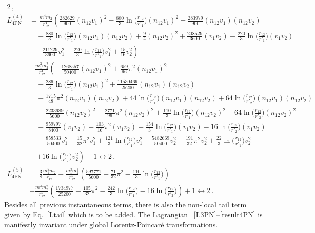 \documentclass[prd,preprint,superscriptaddress,tightenlines,nofootinbib,
  eqsecnum,showpacs]{revtex4}
\begin{document}
{\begin{subequations}
\begin{align}
2\,,\\
L_\text{4PN}^{(4)}&= \frac{m_{1}^4 m_{2}}{r_{12}^4} 
\left(\frac{282629}{900} (n_{12} v_1)^2
 -  \frac{880}{3} \ln\Big(\frac{r_{12}}{r'_{1}}\Big) (n_{12} v_1)^2
 -  \frac{283979}{900} (n_{12} v_1) (n_{12} v_2)\right.\nonumber\\
& \quad + \frac{880}{3} \ln\Big(\frac{r_{12}}{r'_{1}}\Big) (n_{12} v_1) (n_{12} v_2)
 + \frac{9}{4} (n_{12} v_2)^2
 + \frac{208529}{3600} (v_1 v_2)
 -  \frac{220}{3} \ln\Big(\frac{r_{12}}{r'_{1}}\Big) (v_1 v_2)\nonumber\\
&\quad \left. -  \frac{211229}{3600} v_1^{2}
 + \frac{220}{3} \ln\Big(\frac{r_{12}}{r'_{1}}\Big) v_1^{2}
 + \frac{15}{16} v_2^{2}\right) \nonumber \\
& + \frac{m_{1}^3 m_{2}^2}{r_{12}^4} \left(- \frac{1268557}{50400} (n_{12} v_1)^2  
+ \frac{659}{96} \pi^2 (n_{12} v_1)^2
 \right.\nonumber\\
& \quad -  \frac{286}{3} \ln\Big(\frac{r_{12}}{r'_{1}}\Big) (n_{12} v_1)^2
 + \frac{11530469}{25200} (n_{12} v_1) (n_{12} v_2) \nonumber\\
& \quad -  \frac{1715}{48} \pi^2 (n_{12} v_1) (n_{12} v_2)
 + 44 \ln\Big(\frac{r_{12}}{r'_{1}}\Big) (n_{12} v_1) (n_{12} v_2)
 + 64 \ln\Big(\frac{r_{12}}{r'_{2}}\Big) (n_{12} v_1) (n_{12} v_2)\nonumber\\
& \quad -  \frac{2233689}{5600} (n_{12} v_2)^2
 + \frac{2771}{96} \pi^2 (n_{12} v_2)^2
 + \frac{110}{3} \ln\Big(\frac{r_{12}}{r'_{1}}\Big) (n_{12} v_2)^2
 - 64 \ln\Big(\frac{r_{12}}{r'_{2}}\Big) (n_{12} v_2)^2\nonumber\\
& \quad -  \frac{959797}{8400} (v_1 v_2)
 + \frac{103}{16} \pi^2 (v_1 v_2)
 -  \frac{154}{3} \ln\Big(\frac{r_{12}}{r'_{1}}\Big) (v_1 v_2)
 - 16 \ln\Big(\frac{r_{12}}{r'_{2}}\Big) (v_1 v_2)\nonumber\\
& \quad + \frac{858533}{50400} v_1^{2}
 -  \frac{15}{32} \pi^2 v_1^{2}
 + \frac{121}{3} \ln\Big(\frac{r_{12}}{r'_{1}}\Big) v_1^{2}
 + \frac{5482669}{50400} v_2^{2}
 -  \frac{191}{32} \pi^2 v_2^{2}
 + \frac{22}{3} \ln\Big(\frac{r_{12}}{r'_{1}}\Big) v_2^{2}\nonumber\\
&\quad \left. + 16 \ln\Big(\frac{r_{12}}{r'_{2}}\Big) v_2^{2}\right)
 + 1 \leftrightarrow
2\,,\\
L_\text{4PN}^{(5)}&= \frac{3}{8} \frac{m_{1}^5 m_{2}}{r_{12}^5}
 + \frac{m_{1}^3 m_{2}^3}{r_{12}^5} \left(\frac{597771}{5600}
 -  \frac{71}{32} \pi^2
 -  \frac{110}{3} \ln\Big(\frac{r_{12}}{r'_{1}}\Big)\right)
 \nonumber\\
& + \frac{m_{1}^4 m_{2}^2}{r_{12}^5} \left(\frac{1734977}{25200}
 + \frac{105}{32} \pi^2 -  \frac{242}{3} \ln\Big(\frac{r_{12}}{r'_{1}}\Big)
 - 16 \ln\Big(\frac{r_{12}}{r'_{2}}\Big)\right) + 1 \leftrightarrow
2\,.
\end{align}
\end{subequations}}\noindent
%
Besides all previous instantaneous terms, there is also the
non-local tail term given by Eq.~\eqref{Ltail} which is to be added. The Lagrangian ~\eqref{L3PN}--\eqref{result4PN} is manifestly invariant under global Lorentz-Poincar\'e transformations.
\end{document}
